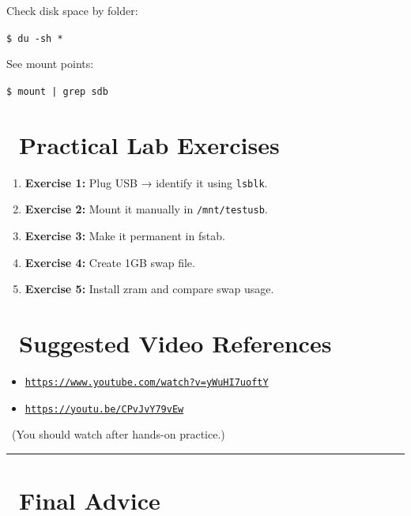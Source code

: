 \documentclass[12pt]{article}
\newcommand{\videoicon}{\faVideo}
\newcommand{\labicon}{\faFlask}
\begin{document}
Check disk space by folder:

\begin{highlightbox}
\texttt{\$ du -sh *}
\end{highlightbox}

See mount points:

\begin{highlightbox}
\texttt{\$ mount | grep sdb}
\end{highlightbox}

\section*{\labicon\ Practical Lab Exercises}

\begin{enumerate}
    \item \textbf{Exercise 1:} Plug USB → identify it using \texttt{lsblk}.
    \item \textbf{Exercise 2:} Mount it manually in \texttt{/mnt/testusb}.
    \item \textbf{Exercise 3:} Make it permanent in fstab.
    \item \textbf{Exercise 4:} Create 1GB swap file.
    \item \textbf{Exercise 5:} Install zram and compare swap usage.
\end{enumerate}

\section*{\videoicon\ Suggested Video References}

\begin{itemize}
    \item \href{https://www.youtube.com/watch?v=yWuHI7uoftY}{\texttt{https://www.youtube.com/watch?v=yWuHI7uoftY}}
    \item \href{https://youtu.be/CPvJvY79vEw}{\texttt{https://youtu.be/CPvJvY79vEw}}
\end{itemize}

\begin{infobox}
\faEye\ (You should watch after hands-on practice.)
\end{infobox}

\vspace{1em}
\begin{center}
\color{teamred}\rule{0.8\textwidth}{1pt}
\end{center}

\section*{\faFlagCheckered\ Final Advice}
\end{document}
